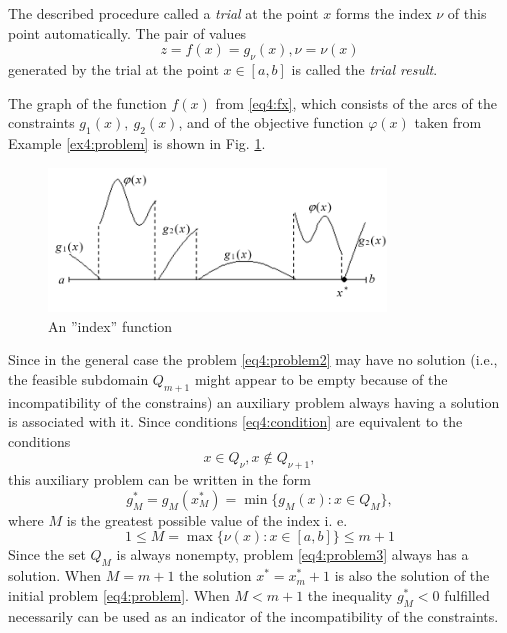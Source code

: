 \documentclass[graybox]{svmult}
\begin{document}
The described procedure called a \emph{trial} at the point $x$ forms the index $\nu$ of this point automatically. The pair of values
\begin{equation}
  \label{eq4:trial}
  z=f(x)=g_\nu(x),\nu=\nu(x)
\end{equation}
generated by the trial at the point $x\in[a,b]$ is called the \emph{trial result}.

The graph of the function $f(x)$ from \eqref{eq4:fx}, which consists of the arcs of the constraints $g_1(x),\:g_2(x)$, and of the objective function $\varphi(x)$ taken from Example \ref{ex4:problem} is shown in Fig. \ref{fig:4_3}.

\begin{figure}[h]
  \label{fig:4_3}
  \centering
  \includegraphics[width=0.8\textwidth]{figures/4_3.png}
  \caption{An ''index'' function}
\end{figure}

Since in the general case the problem \eqref{eq4:problem2} may have no solution (i.e., the feasible subdomain $Q_{m+1}$ might appear to be empty because of the incompatibility of the constrains) an auxiliary problem always having a solution is associated with it. Since conditions \eqref{eq4:condition} are equivalent to the conditions
\begin{displaymath}
  x\in Q_\nu,x\not\in Q_{\nu+1},
\end{displaymath}
this auxiliary problem can be written in the form
\begin{equation}
  \label{eq4:problem3}
  g_M^*=g_M(x_M^*)=\min\{g_M(x):x\in Q_M\},
\end{equation}
where $M$ is the greatest possible value of the index i. e.
\begin{equation}
  1\le M=\max\{\nu(x):x\in[a,b]\}\le m+1
\end{equation}
Since the set $Q_M$ is always nonempty, problem \eqref{eq4:problem3} always has a solution. When $M=m+1$ the solution $x^*=x^*_m+1$  is also the solution of the initial problem \eqref{eq4:problem}. When $M<m+1$ the inequality $g_M^*<0$ fulfilled necessarily can be used as an indicator of the incompatibility of the constraints.
\end{document}
